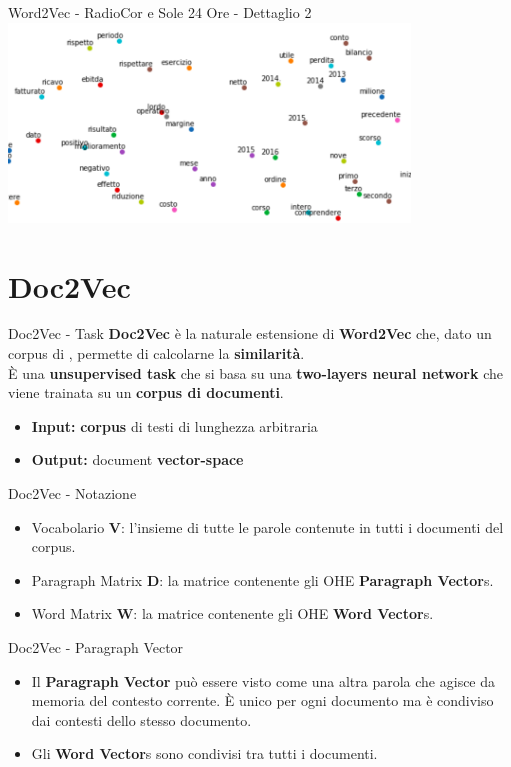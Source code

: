 \documentclass[british]{beamer}
\begin{document}
\begin{frame}{Word2Vec - RadioCor e Sole 24 Ore - Dettaglio 2}
	\includegraphics[width= 0.8\textwidth]{./Imgs/plot-anni.png}
\end{frame}

\section{Doc2Vec}

\begin{frame}{Doc2Vec - Task}
	\textbf{Doc2Vec} \`{e} la naturale estensione di \textbf{Word2Vec} che, dato un corpus di , permette di calcolarne la \textbf{similarit\`{a}}.\\
	\`{E} una \textbf{unsupervised task} che si basa su una \textbf{\alert{two-layers neural network}} che viene trainata su un \textbf{corpus di documenti}. 
	\begin{itemize}
		\item \textbf{Input: }\textbf{corpus} di testi di lunghezza arbitraria
		\item \textbf{Output: }document \textbf{vector-space}
	\end{itemize}		
\end{frame}

\begin{frame}{Doc2Vec - Notazione}
	\begin{itemize}
		\item Vocabolario \textbf{V}: l'insieme di tutte le parole contenute in tutti i documenti del corpus.
		\item Paragraph Matrix \textbf{D}: la matrice contenente gli OHE \textbf{Paragraph Vector}s.
		\item Word Matrix \textbf{W}: la matrice contenente gli OHE \textbf{Word Vector}s.
	\end{itemize}
\end{frame}

\begin{frame}{Doc2Vec - Paragraph Vector}
	\begin{itemize}
		\item Il \textbf{Paragraph Vector} pu\`{o} essere visto come una altra parola che agisce da memoria del contesto corrente.
		 \`{E} unico per ogni documento ma \`{e} condiviso dai contesti dello stesso documento.
		\item Gli \textbf{Word Vector}s sono condivisi tra tutti i documenti.
	\end{itemize}
\end{frame}
\end{document}
